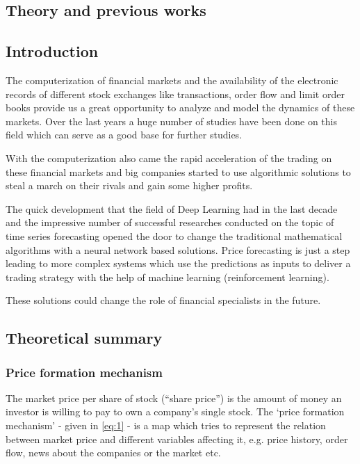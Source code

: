 \documentclass[11pt,a4paper,oneside]{article}
\begin{document}
\begin{center}
  \section{Theory and previous works}
  \label{sec:theory_prev}
\end{center}
\subsection{Introduction}
\label{sec:introduction}

The computerization of financial markets and the availability of the electronic records of different stock exchanges 
like transactions, order flow and limit order books provide us a great opportunity to analyze and model the dynamics of 
these markets. Over the last years a huge number of studies have been done on this field which can serve as a good base 
for further studies.

With the computerization also came the rapid acceleration of the trading on these financial markets and big companies 
started to use algorithmic solutions to steal a march on their rivals and gain some higher profits.

The quick development that the field of Deep Learning had in the last decade and the impressive number of successful 
researches conducted on the topic of time series forecasting opened the door to change the traditional mathematical 
algorithms with a neural network based solutions. Price forecasting is just a step leading to more complex systems 
which use the predictions as inputs to deliver a trading strategy with the help of machine learning 
(reinforcement learning).

These solutions could change the role of financial specialists in the future.

\subsection{Theoretical summary}
\label{sec:theoretical_summary}

  \subsubsection{Price formation mechanism}
  \label{sec:price_formation_mechanism}
  
  The market price per share of stock (“share price”) is the amount of money an investor is willing to pay to own 
  a company's single stock. The ‘price formation mechanism’ - given in \autoref{eq:1} - is a map which tries to 
  represent the relation between market price and different variables affecting it, e.g. price history, order flow, 
  news about the companies or the market etc.
\end{document}
